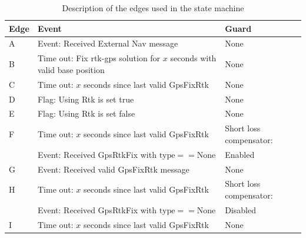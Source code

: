 \begin{table}[H]

    \begin{tabular}{ | p{1cm} | p{8cm} | | p{4cm} |}
    \hline
    \textbf{Edge} 	& \textbf{Event} 																	& \textbf{Guard} \\ \hline
    A 				& Event: Received External Nav message 												& None \\ \hline
    B 				& Time out: Fix \gls{rtk-gps} solution for $x$ seconds with valid base position 	& None \\ \hline
    C 				& Time out: $x$ seconds since last valid GpsFixRtk 									& None \\ \hline
    D 				& Flag: Using Rtk is set true														& None \\ \hline
    E 				& Flag: Using Rtk is set false														& None \\ \hline
    F 				& Time out: $x$ seconds since last valid GpsFixRtk 									& Short loss compensator:\\ 
      				& Event: Received GpsRtkFix with $\text{type}==\text{None}$ 						& Enabled\\ \hline
    G 				& Event: Received valid GpsFixRtk message											& None \\ \hline
    H 				& Time out: $x$ seconds since last valid GpsFixRtk 									& Short loss compensator:\\
    				& Event: Received GpsRtkFix with $\text{type}==\text{None}$							& Disabled \\ \hline
    I 				& Time out: $x$ seconds since last valid GpsFixRtk 									& None \\ \hline
    \end{tabular}

\caption{Description of the edges used in the state machine}
\label{Tb:Nav state edge}
\end{table}
